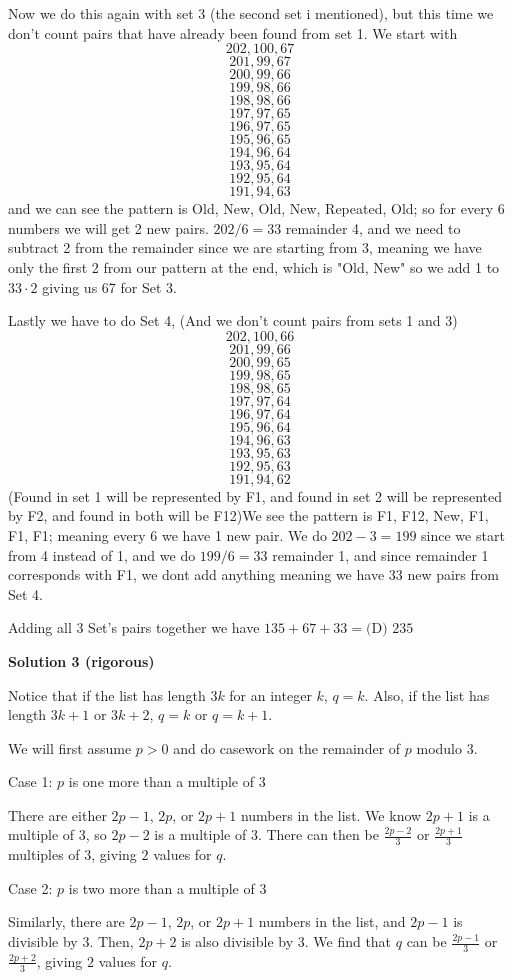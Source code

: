 \begin{enumerate}
 Now we do this again with set 3 (the second set i mentioned), but this time we don't count pairs that have already been found from set 1. We start with 
 \[202, 100, 67\]
 \[201, 99, 67\]
 \[200, 99, 66\]
 \[199, 98, 66\]
 \[198, 98, 66\]
 \[197, 97, 65\]
 \[196, 97, 65\]
 \[195, 96, 65\]
 \[194, 96, 64\]
 \[193, 95, 64\]
 \[192, 95, 64\]
 \[191, 94, 63\]and we can see the pattern is Old, New, Old, New, Repeated, Old; so for every 6 numbers we will get 2 new pairs. $202/6=33$ remainder 4, and we need to subtract 2 from the remainder since we are starting from 3, meaning we have only the first 2 from our pattern at the end, which is "Old, New" so we add 1 to $33\cdot2$ giving us 67 for Set 3.

 Lastly we have to do Set 4, (And we don't count pairs from sets 1 and 3)
 \[202, 100, 66\]
 \[201, 99, 66\]
 \[200, 99, 65\]
 \[199, 98, 65\]
 \[198, 98, 65\]
 \[197, 97, 64\]
 \[196, 97, 64\]
 \[195, 96, 64\]
 \[194, 96, 63\]
 \[193, 95, 63\]
 \[192, 95, 63\]
 \[191, 94, 62\](Found in set 1 will be represented by F1, and found in set 2 will be represented by F2, and found in both will be F12)We see the pattern is F1, F12, New, F1, F1, F1; meaning every 6 we have 1 new pair. We do $202-3=199$ since we start from 4 instead of 1, and we do $199/6=33$ remainder 1, and since remainder 1 corresponds with F1, we dont add anything meaning we have 33 new pairs from Set 4.

 Adding all 3 Set's pairs together we have $135+67+33=\boxed{\text{(D) }235}$




\textbf{Solution 3 (rigorous)}

Notice that if the list has length $3k$ for an integer $k$, $q=k$. Also, if the list has length $3k+1$ or $3k+2$, $q=k$ or $q=k+1$.

 We will first assume $p>0$ and do casework on the remainder of $p$ modulo $3$.

 Case 1: $p$ is one more than a multiple of $3$

 There are either $2p-1$, $2p$, or $2p+1$ numbers in the list. We know $2p+1$ is a multiple of $3$, so $2p-2$ is a multiple of $3$. There can then be $\frac{2p-2}{3}$ or $\frac{2p+1}{3}$ multiples of $3$, giving $2$ values for $q$.

 
Case 2: $p$ is two more than a multiple of $3$

 Similarly, there are $2p-1$, $2p$, or $2p+1$ numbers in the list, and $2p-1$ is divisible by $3$. Then, $2p+2$ is also divisible by $3$. We find that $q$ can be $\frac{2p-1}{3}$ or $\frac{2p+2}{3}$, giving $2$ values for $q$.


\end{enumerate}
